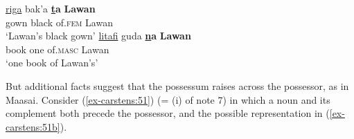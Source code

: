 \documentclass[output=paper
,modfonts
,nonflat]{langsci/langscibook}
\begin{document}
\begin{exe}
	 \citep[301]{Newman2000}
	\xlist
	\ex 
	\gll \underline{riga}   bak’a   \textbf{\underline{t}a}       \textbf{Lawan} \\
	gown   black   of.\textsc{fem}    Lawan\\
	\glt `Lawan’s black gown'  	
	\ex 
	\gll \underline{litafi}     guda \textbf{\underline{n}a}       \textbf{Lawan}\\
	book one  of.\textsc{masc}  Lawan\\
	\glt `one book of Lawan's'
	\endxlist
\end{exe}
But additional facts suggest that the possessum raises across the possessor, as in Maasai.  Consider (\ref{ex-carstens:51}) (= (i) of note 7) in which a noun and its complement both precede the possessor, and the possible representation in (\ref{ex-carstens:51b}). 
\end{document}
